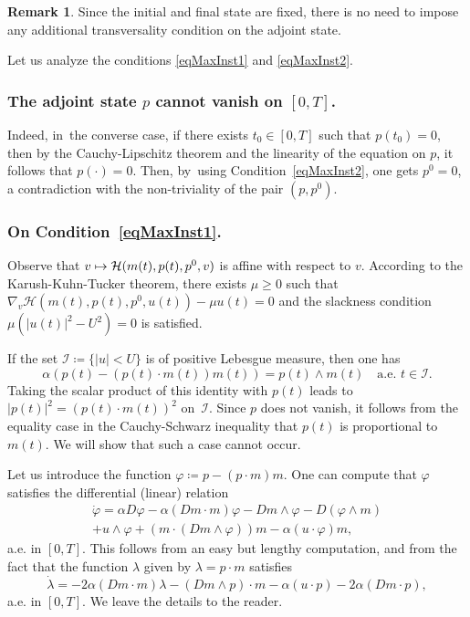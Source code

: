 \documentclass[JEP,XML,SOM,Unicode,NoEqCountersInSection,NoFloatCountersInSection,published]{cedram}
\newcommand\mto{\mathchoice{\longmapsto}{\mapsto}{\mapsto}{\mapsto}}
\theoremstyle{definition}
\newtheorem{remark}[theorem]{Remark}
\begin{document}
\begin{remark}
Since the initial and final state are fixed, there is no need to impose any {additional} transversality condition on the adjoint state.
\end{remark}

Let us analyze the conditions \eqref{eqMaxInst1} and \eqref{eqMaxInst2}.

\subsubsection*{The adjoint state $p$ cannot vanish on $[0,T]$.} Indeed, in~the converse case, if there exists $t_0\in [0,T]$ such that $p(t_0)=0$, {then by the Cauchy-Lipschitz theorem and the linearity of the equation on $p$, it follows} that $p(\cdot)=0$. Then, by~using Condition~\eqref{eqMaxInst2}, one gets $p^0=0$, a contradiction with the non-triviality of the pair $(p,p^0)$.

\subsubsection*{On Condition~\eqref{eqMaxInst1}.}
Observe that $v\mto \mathcal{H} (m(t),p(t),p^0,v)$ is affine with respect to $v$. According to the Karush-Kuhn-Tucker theorem, there exists $\mu\geq 0$ such that $\nabla_v \mathcal{H} (m(t),p(t),p^0,u (t))-\mu u (t)=0$ and the slackness condition $\mu(|u (t)|^2-U ^2)=0$ is satisfied.

If the set $\mathcal I \coloneqq \{|u|<U \}$ is of positive Lebesgue measure, then one has \[ \alpha (p(t)-(p(t)\cdot m(t))m(t))=p(t)\wedge m(t) \quad \text{a.e. } t \in \mathcal I. \]
Taking the scalar product of this identity with $p(t)$ leads to $|p(t)|^2=(p(t)\cdot m(t))^2$ on~$\mathcal I$. Since $p$ does not vanish, it follows from the equality case in the Cauchy-Schwarz inequality that $p(t)$ is proportional to $m(t)$. We will show that such a case cannot occur.

Let us introduce the function $\varphi \coloneqq p-(p\cdot m)m$. One can compute that $\varphi$ satisfies the differential (linear) relation
\begin{multline}\label{eq1155}
\dot{\varphi}=\alpha D\varphi-\alpha (Dm\cdot m)\varphi -Dm\wedge \varphi-D(\varphi\wedge m)\\
+ u\wedge \varphi +(m\cdot (Dm\wedge \varphi))m-\alpha (u\cdot \varphi)m,
\end{multline}
a.e. in $[0,T]$. This follows from an easy but lengthy computation, and from the fact that the function $\lambda$ given by $\lambda=p\cdot m$ satisfies
\[
\dot{\lambda}= -2\alpha (Dm\cdot m)\lambda-(Dm\wedge p)\cdot m-\alpha (u\cdot p) - 2 \alpha (Dm \cdot p),
\]
a.e. in $[0,T]$. We leave the details to the reader.
\end{document}

